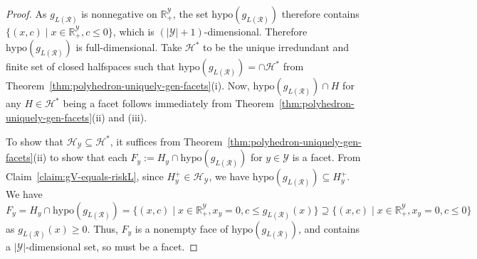 \documentclass[twoside,11pt]{article}
\newcommand{\Comments}{1}
\newcommand{\mynote}[2]{\ifnum\Comments=1\textcolor{#1}{#2}\fi}
\newcommand{\mytodo}[2]{\ifnum\Comments=1%
  \todo[linecolor=#1!80!black,backgroundcolor=#1,bordercolor=#1!80!black]{#2}\fi}
\newcommand{\raft}[1]{\mytodo{green!20!white}{RF: #1}}
\newcommand{\jessie}[1]{\mynote{teal}{[JF: #1]}}
\newcommand{\reals}{\mathbb{R}}
\renewcommand{\H}{\mathcal{H}}
\newcommand{\R}{\mathcal{R}}
\newcommand{\V}{\mathcal{V}}
\newcommand{\Y}{\mathcal{Y}}
\newcommand{\hyp}{\mathrm{hypo}}
\begin{document}
\begin{proof}
	As $g_{L(\R)}$ is nonnegative on $\reals_+^\Y$, the set $\hyp(g_{L(\R)})$ therefore contains $\{(x,c) \mid x\in\reals^\Y_+, c \leq 0\}$, which is $(|\Y| + 1)$-dimensional.
  Therefore $\hyp(g_{L(\R)})$ is full-dimensional.
	Take $\H^*$ to be the unique irredundant and finite set of closed halfspaces such that $\hyp(g_{L(\R)}) = \cap \H^*$ from Theorem~\ref{thm:polyhedron-uniquely-gen-facets}(i).
  Now, $\hyp(g_{L(\R)}) \cap H$ for any $H \in \H^*$ being a facet follows immediately from Theorem~\ref{thm:polyhedron-uniquely-gen-facets}(ii) and (iii).
  
  To show that $\H_\Y \subseteq \H^*$, it suffices from Theorem~\ref{thm:polyhedron-uniquely-gen-facets}(ii) to show that each $F_y := H_y \cap \hyp(g_{L(\R)})$ for $y\in\Y$ is a facet.
  From Claim~\ref{claim:gV-equals-riskL}, since $H_y^+ \in \H_\Y$, we have $\hyp(g_{L(\R)}) \subseteq H_y^+$.
  We have $F_y = H_{y} \cap \hyp(g_{L(\R)}) = \{(x,c) \mid x\in\reals^\Y_+, x_y=0, c \leq g_{L(\R)}(x)\} \supseteq \{(x,c) \mid x\in\reals^\Y_+, x_y=0, c \leq 0\}$ as $g_{L(\R)}(x) \geq 0$.
  Thus, $F_y$ is a nonempty face of $\hyp(g_{L(\R)})$, and contains a $|\Y|$-dimensional set, so must be a facet.
\end{proof}


%  
%
\end{document}
